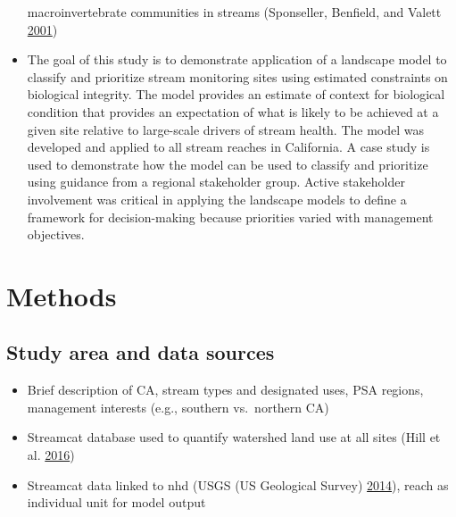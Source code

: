 \documentclass[]{article}
\begin{document}
\begin{itemize}
  macroinvertebrate communities in streams (Sponseller, Benfield, and
  Valett \protect\hyperlink{ref-Sponseller01}{2001})
\item
  The goal of this study is to demonstrate application of a landscape
  model to classify and prioritize stream monitoring sites using
  estimated constraints on biological integrity. The model provides an
  estimate of context for biological condition that provides an
  expectation of what is likely to be achieved at a given site relative
  to large-scale drivers of stream health. The model was developed and
  applied to all stream reaches in California. A case study is used to
  demonstrate how the model can be used to classify and prioritize using
  guidance from a regional stakeholder group. Active stakeholder
  involvement was critical in applying the landscape models to define a
  framework for decision-making because priorities varied with
  management objectives.
\end{itemize}

\section{Methods}\label{methods}

\subsection{Study area and data
sources}\label{study-area-and-data-sources}

\begin{itemize}
\item
  Brief description of CA, stream types and designated uses, PSA
  regions, management interests (e.g., southern vs.~northern CA)
\item
  Streamcat database used to quantify watershed land use at all sites
  (Hill et al. \protect\hyperlink{ref-Hill16}{2016})
\item
  Streamcat data linked to \ac{nhd} (USGS (US Geological Survey)
  \protect\hyperlink{ref-USGS14}{2014}), reach as individual unit for
  model output
\end{itemize}
\end{document}
